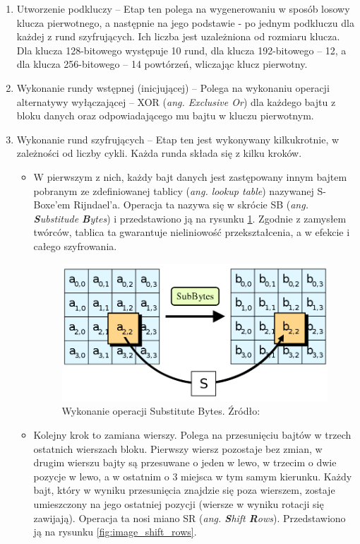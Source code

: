 \begin{enumerate}
\item  Utworzenie podkluczy – Etap ten polega na wygenerowaniu w sposób losowy klucza pierwotnego, a następnie na jego podstawie - po jednym podkluczu dla każdej z rund szyfrujących. Ich liczba jest uzależniona od rozmiaru klucza. Dla klucza 128-bitowego występuje 10 rund, dla klucza 192-bitowego – 12, a dla klucza 256-bitowego – 14 powtórzeń, wliczając klucz pierwotny.

\item Wykonanie rundy wstępnej (inicjującej) – Polega na wykonaniu operacji alternatywy wyłączającej – XOR (\textit{ang. Exclusive Or}) dla każdego bajtu z bloku danych oraz odpowiadającego mu bajtu w kluczu pierwotnym.

\item Wykonanie rund szyfrujących – Etap ten jest wykonywany kilkukrotnie, w zależności od liczby cykli. Każda runda składa się z kilku kroków. 

	\begin{itemize}
	\item W pierwszym z nich, każdy bajt danych jest zastępowany innym bajtem pobranym ze zdefiniowanej tablicy (\textit{ang. lookup table}) nazywanej S-Boxe’em Rijndael’a. Operacja ta nazywa się w skrócie SB (\textit{ang. \textbf{S}ubstitude \textbf{B}ytes}) i przedstawiono ją na rysunku \ref{fig:image_substitute_bytes}. Zgodnie z zamysłem twórców, tablica ta gwarantuje nieliniowość przekształcenia, a w efekcie i całego szyfrowania.
	
	\begin{figure}[h]
		\centering
		\includegraphics[width=10cm]{img/com_security/800px-AES-SubBytes.png}
		\caption{Wykonanie operacji Substitute Bytes. Źródło: \cite{aes_wiki}}
		\label{fig:image_substitute_bytes}
	\end{figure}

	\item  Kolejny krok to zamiana wierszy. Polega na przesunięciu bajtów w trzech ostatnich wierszach bloku. Pierwszy wiersz pozostaje bez zmian, w drugim wierszu bajty są przesuwane o jeden w lewo, w trzecim o dwie pozycje w lewo, a w ostatnim o 3 miejsca w tym samym kierunku. Każdy bajt, który w wyniku przesunięcia znajdzie się poza wierszem, zostaje umieszczony na jego ostatniej pozycji (wiersze w wyniku rotacji się zawijają). Operacja ta nosi miano SR (\textit{ang. \textbf{S}hift \textbf{R}ows}). Przedstawiono ją na rysunku \ref{fig:image_shift_rows}.
	

\end{itemize}
\end{enumerate}
